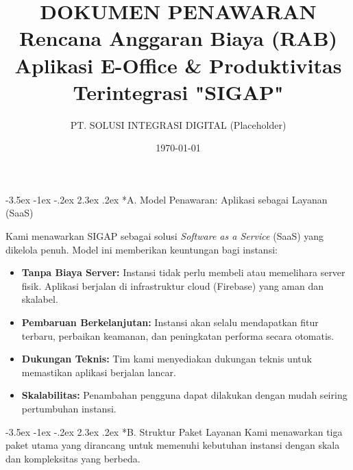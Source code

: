 \documentclass[11pt, a4paper]{article}
\title{
    DOKUMEN PENAWARAN \\
    \vspace{0.5em}
    \LARGE Rencana Anggaran Biaya (RAB) \\
    \vspace{0.25em}
    \Large Aplikasi E-Office \& Produktivitas Terintegrasi "SIGAP"
}
\author{PT. SOLUSI INTEGRASI DIGITAL (Placeholder)}
\date{\today}
\makeatletter
\renewcommand\section{\@startsection {section}{1}{\z@}%
                                   {-3.5ex \@plus -1ex \@minus -.2ex}%
                                   {2.3ex \@plus.2ex}%
                                   {\normalfont\Large\bfseries}}
\makeatother
\begin{document}
\maketitle
\thispagestyle{empty} %

\newpage
{} %

\section*{A. Model Penawaran: Aplikasi sebagai Layanan (SaaS)}

Kami menawarkan SIGAP sebagai solusi \textit{Software as a Service} (SaaS) yang dikelola penuh. Model ini memberikan keuntungan bagi instansi:
\begin{itemize}
    \item \textbf{Tanpa Biaya Server:} Instansi tidak perlu membeli atau memelihara server fisik. Aplikasi berjalan di infrastruktur cloud (Firebase) yang aman dan skalabel.
    \item \textbf{Pembaruan Berkelanjutan:} Instansi akan selalu mendapatkan fitur terbaru, perbaikan keamanan, dan peningkatan performa secara otomatis.
    \item \textbf{Dukungan Teknis:} Tim kami menyediakan dukungan teknis untuk memastikan aplikasi berjalan lancar.
    \item \textbf{Skalabilitas:} Penambahan pengguna dapat dilakukan dengan mudah seiring pertumbuhan instansi.
\end{itemize}

\vspace{1em}

\section*{B. Struktur Paket Layanan}
Kami menawarkan tiga paket utama yang dirancang untuk memenuhi kebutuhan instansi dengan skala dan kompleksitas yang berbeda.
\end{document}
